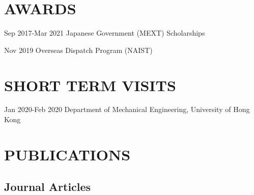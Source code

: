 \documentclass[letterpaper]{article}
\renewenvironment{itemize}{
  \begin{list}{}{
    \setlength{\leftmargin}{0em}
  }
}{
  \end{list}
}
\begin{document}
\section*{AWARDS}

\begin{itemize}
\item Sep 2017-Mar 2021 \hspace{2.9em}Japanese Government (MEXT) Scholarships
\item Nov 2019 \hspace{7.0em}Overseas Dispatch Program (NAIST)
\end{itemize}

\section*{SHORT TERM VISITS}

\begin{itemize}
	\item Jan 2020-Feb 2020 \hspace{3.1em}Department of Mechanical Engineering, University of Hong Kong
	
\end{itemize}

\section*{PUBLICATIONS}

\subsection*{Journal Articles}
\end{document}
